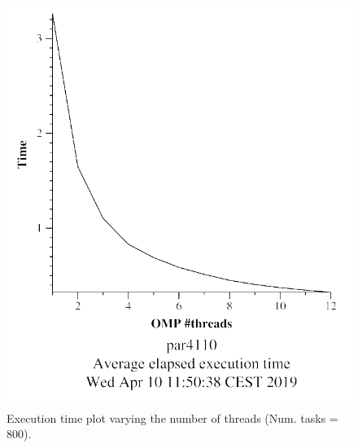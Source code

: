 \documentclass[12pt, a4paper]{article}
\begin{document}
\begin{figure}[H]
\centering
\begin{minipage}[b]{0.4\linewidth}
  \centering
  \includegraphics[scale=0.5]{./mandel-omp-10000-strong-omp-3-800-time}
  \caption{Execution time plot varying the number of threads (Num. tasks = 800).}
  \label{fig:mandel-omp-10000-strong-omp-3-800-time}
\end{minipage}%
\hspace{0.5cm}
\begin{minipage}[b]{0.4\linewidth}
  \centering

\end{minipage}
\end{figure}
\end{document}
